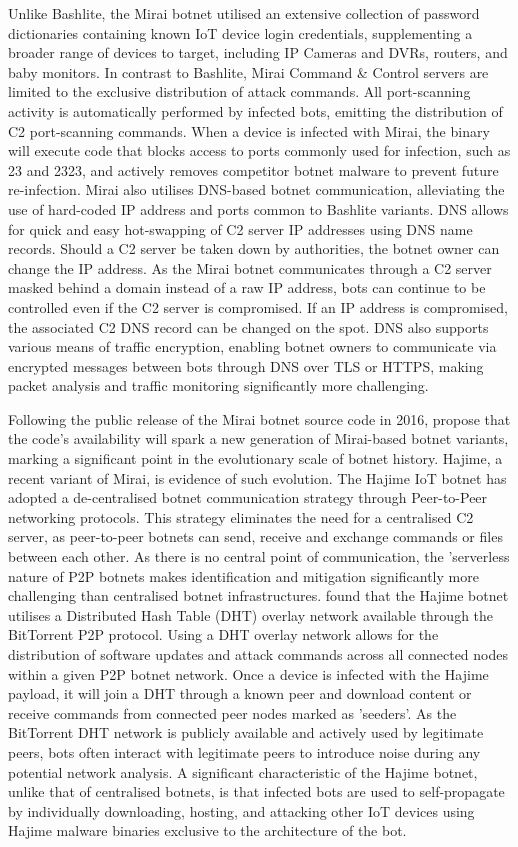 Unlike Bashlite, the Mirai botnet utilised an extensive collection of password dictionaries containing known IoT device login credentials, supplementing a broader range of devices to target, including IP Cameras and DVRs, routers, and baby monitors. In contrast to Bashlite, Mirai Command \& Control servers are limited to the exclusive distribution of attack commands. All port-scanning activity is automatically performed by infected bots, emitting the distribution of C2 port-scanning commands. When a device is infected with Mirai, the binary will execute code that blocks access to ports commonly used for infection, such as 23 and 2323, and actively removes competitor botnet malware to prevent future re-infection. Mirai also utilises DNS-based botnet communication, alleviating the use of hard-coded IP address and ports common to Bashlite variants. DNS allows for quick and easy hot-swapping of C2 server IP addresses using DNS name records. Should a C2 server be taken down by authorities, the botnet owner can change the IP address. As the Mirai botnet communicates through a C2 server masked behind a domain instead of a raw IP address, bots can continue to be controlled even if the C2 server is compromised. If an IP address is compromised, the associated C2 DNS record can be changed on the spot. DNS also supports various means of traffic encryption, enabling botnet owners to communicate via encrypted messages between bots through DNS over TLS or HTTPS, making packet analysis and traffic monitoring significantly more challenging. 

Following the public release of the Mirai botnet source code in 2016, \citet{Antonakakis2017} propose that the code's availability will spark a new generation of Mirai-based botnet variants, marking a significant point in the evolutionary scale of botnet history. Hajime, a recent variant of Mirai, is evidence of such evolution. The Hajime IoT botnet has adopted a de-centralised botnet communication strategy through Peer-to-Peer networking protocols. This strategy eliminates the need for a centralised C2 server, as peer-to-peer botnets can send, receive and exchange commands or files between each other. As there is no central point of communication, the 'serverless nature of P2P botnets makes identification and mitigation significantly more challenging than centralised botnet infrastructures. \citet{Herwig2019} found that the Hajime botnet utilises a Distributed Hash Table (DHT) overlay network available through the BitTorrent P2P protocol. Using a DHT overlay network allows for the distribution of software updates and attack commands across all connected nodes within a given P2P botnet network. Once a device is infected with the Hajime payload, it will join a DHT through a known peer and download content or receive commands from connected peer nodes marked as 'seeders'. As the BitTorrent DHT network is publicly available and actively used by legitimate peers, bots often interact with legitimate peers to introduce noise during any potential network analysis. A significant characteristic of the Hajime botnet, unlike that of centralised botnets, is that infected bots are used to self-propagate by individually downloading, hosting, and attacking other IoT devices using Hajime malware binaries exclusive to the architecture of the bot.

